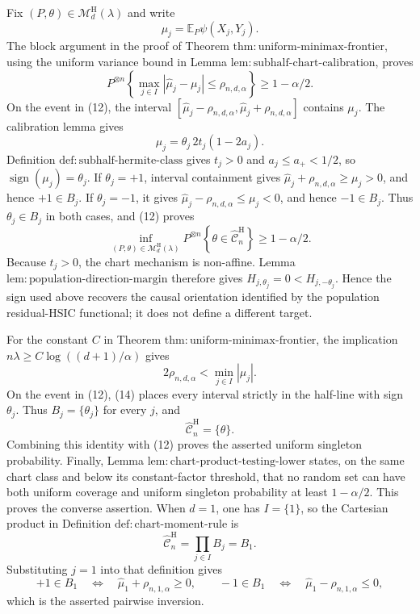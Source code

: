 Fix \((P,\theta)\in\mathcal M_d^{\mathrm H}(\lambda)\) and write
\[
\mu_j=\mathbb E_P\psi(X_j,Y_j).
\]
The block argument in the proof of Theorem \(\mathrm{thm:uniform\text{-}minimax\text{-}frontier}\), using the uniform variance bound in Lemma \(\mathrm{lem:subhalf\text{-}chart\text{-}calibration}\), proves
\[
P^{\otimes n}\left\{\max_{j\in I}|\widehat\mu_j-\mu_j|
\le\rho_{n,d,\alpha}\right\}
\ge1-\alpha/2.
\tag{12}
\]
On the event in (12), the interval \([\widehat\mu_j-\rho_{n,d,\alpha},\widehat\mu_j+\rho_{n,d,\alpha}]\) contains \(\mu_j\).  The calibration lemma gives
\[
\mu_j=\theta_j\,2t_j(1-2a_j).
\]
Definition \(\mathrm{def:subhalf\text{-}hermite\text{-}class}\) gives \(t_j>0\) and \(a_j\le a_+<1/2\), so \(\operatorname{sign}(\mu_j)=\theta_j\).  If \(\theta_j=+1\), interval containment gives \(\widehat\mu_j+\rho_{n,d,\alpha}\ge\mu_j>0\), and hence \(+1\in B_j\).  If \(\theta_j=-1\), it gives \(\widehat\mu_j-\rho_{n,d,\alpha}\le\mu_j<0\), and hence \(-1\in B_j\).  Thus \(\theta_j\in B_j\) in both cases, and (12) proves
\[
\inf_{(P,\theta)\in\mathcal M_d^{\mathrm H}(\lambda)}
P^{\otimes n}\left\{\theta\in\widehat{\mathcal C}_n^{\mathrm H}\right\}
\ge1-\alpha/2.
\tag{13}
\]
Because \(t_j>0\), the chart mechanism is non-affine.  Lemma \(\mathrm{lem:population\text{-}direction\text{-}margin}\) therefore gives \(H_{j,\theta_j}=0<H_{j,-\theta_j}\).  Hence the sign used above recovers the causal orientation identified by the population residual-HSIC functional; it does not define a different target.

For the constant \(C\) in Theorem \(\mathrm{thm:uniform\text{-}minimax\text{-}frontier}\), the implication \(n\lambda\ge C\log((d+1)/\alpha)\) gives
\[
2\rho_{n,d,\alpha}<\min_{j\in I}|\mu_j|.
\tag{14}
\]
On the event in (12), (14) places every interval strictly in the half-line with sign \(\theta_j\).  Thus \(B_j=\{\theta_j\}\) for every \(j\), and
\[
\widehat{\mathcal C}_n^{\mathrm H}=\{\theta\}.
\]
Combining this identity with (12) proves the asserted uniform singleton probability.  Finally, Lemma \(\mathrm{lem:chart\text{-}product\text{-}testing\text{-}lower}\) states, on the same chart class and below its constant-factor threshold, that no random set can have both uniform coverage and uniform singleton probability at least \(1-\alpha/2\).  This proves the converse assertion.
When \(d=1\), one has \(I=\{1\}\), so the Cartesian product in Definition \(\mathrm{def:chart\text{-}moment\text{-}rule}\) is
\[
\widehat{\mathcal C}_n^{\mathrm H}=\prod_{j\in I}B_j=B_1.
\]
Substituting \(j=1\) into that definition gives
\[
+1\in B_1
\quad\Longleftrightarrow\quad
\widehat\mu_1+\rho_{n,1,\alpha}\ge0,
\qquad
-1\in B_1
\quad\Longleftrightarrow\quad
\widehat\mu_1-\rho_{n,1,\alpha}\le0,
\]
which is the asserted pairwise inversion.

